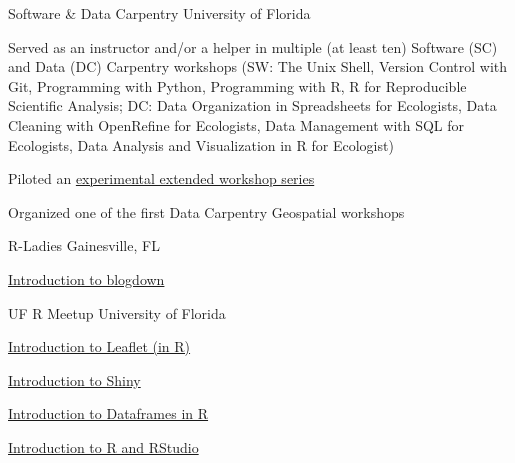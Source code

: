 \begin{cventries}

\cventry
    {Software \& Data Carpentry} %
    {} %
    {} %
    {University of Florida} %
    {
      \begin{cvitems} %
        \item {Served as an instructor and/or a helper in multiple (at least ten) Software (SC) and  Data (DC) Carpentry workshops (SW: The Unix Shell, Version Control with Git, Programming with Python, Programming with R, R for Reproducible Scientific Analysis; DC: Data Organization in Spreadsheets for Ecologists, Data Cleaning with OpenRefine for Ecologists, Data Management with SQL for Ecologists, Data Analysis and Visualization in R for Ecologist)}
        \item {Piloted an \href{https://datacarpentry.org/blog/2018/04/dc-seven-weeks}{experimental extended workshop series}}
        \item {Organized one of the first Data Carpentry Geospatial workshops}
      \end{cvitems}
    }

\cventry
    {R-Ladies} %
    {} %
    {} %
    {Gainesville, FL} %
    {
      \begin{cvitems} %
        \item {\href{https://www.justinmillar.com/r-ladies-blogdown.html}{Introduction to blogdown}}
      \end{cvitems}
    }

\cventry
    {UF R Meetup} %
    {} %
    {} %
    {University of Florida} %
    {
      \begin{cvitems} %
        \item {\href{https://justinmillar.github.io/leaflet-intro/#1}{Introduction to Leaflet (in R)}}
        \item {\href{http://www.r-gators.com/2018/03/28/introduction-to-shiny/}{Introduction to Shiny}}
        \item {\href{http://www.r-gators.com/2017/09/06/introduction-to-dataframes-in-r/}{Introduction to Dataframes in R}}
        \item {\href{http://www.r-gators.com/2017/08/30/introduction-to-r-and-rstudio/}{Introduction to R and RStudio}}
      \end{cvitems}
    }


\end{cventries}
